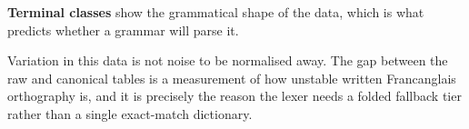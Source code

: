 

\textbf{Terminal classes} show the grammatical shape of the data, which is what predicts
whether a grammar will parse it.



\begin{keypoint}
Variation in this data is not noise to be normalised away. The gap between the raw and
canonical tables is a measurement of how unstable written Francanglais orthography is,
and it is precisely the reason the lexer needs a folded fallback tier rather than a single
exact-match dictionary.
\end{keypoint}
